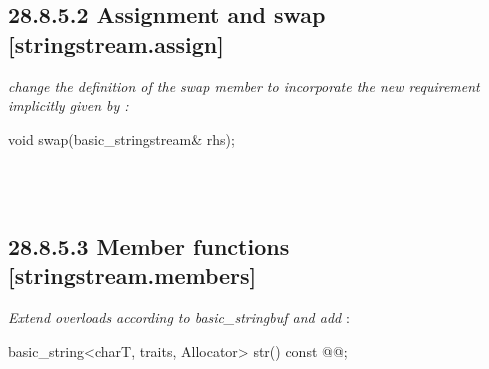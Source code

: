 \documentclass[ebook,11pt,article]{memoir}
\begin{document}
\subsection{28.8.5.2 Assignment and swap [stringstream.assign]}
\textit{change the definition of the swap member to incorporate the new requirement implicitly given by :}

%
\begin{itemdecl}
void swap(basic_stringstream& rhs);
\end{itemdecl}

\begin{itemdescr}
\pnum
\effects {}
\\
\added{\tcode{;}}\\
\added{\tcode{;}}
\end{itemdescr}


\subsection{28.8.5.3 Member functions [stringstream.members]}
\textit{Extend  overloads according to basic_stringbuf and add }:

%
\begin{itemdecl}
basic_string<charT, traits, Allocator> str() const @\added{\&}@;
\end{itemdecl}

\begin{itemdescr}
\pnum
\removed{\returns}
\added{\tcode{;}}
\end{itemdescr}
\end{document}
